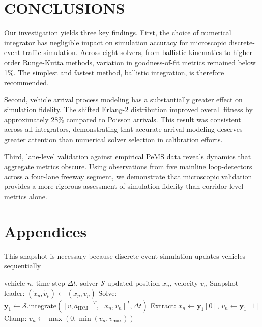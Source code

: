 \documentclass{scspaperproc}
\theoremstyle{scsthe}
\begin{document}
\section{CONCLUSIONS}
\enlargethispage{3\baselineskip}
\label{sec:conclusions}
Our investigation yields three key findings. First, the choice of numerical integrator
has negligible impact on simulation accuracy for microscopic discrete-event traffic simulation. Across eight solvers, from ballistic kinematics to higher-order Runge-Kutta methods, variation in goodness-of-fit metrics remained below 1\%. The simplest and fastest method, ballistic integration, is therefore recommended.

Second, vehicle arrival process modeling has a substantially greater effect on simulation fidelity. The shifted Erlang-2 distribution improved overall fitness by approximately 28\% compared to Poisson arrivals. This result was consistent across all integrators, demonstrating that accurate arrival modeling deserves greater attention than numerical solver selection in calibration efforts.

Third, lane-level validation against empirical PeMS data reveals dynamics that aggregate metrics obscure. Using observations from five mainline loop-detectors across a four-lane freeway segment, we demonstrate that microscopic validation provides a more rigorous assessment of simulation fidelity than corridor-level metrics alone.


\appendix
\section{Appendices} \label{app:quadratic}
This snapshot is necessary because discrete-event simulation updates vehicles sequentially
\begin{algorithm}
\caption{Per-Vehicle State Update}
\begin{algorithmic}[1]
\Require vehicle $n$, time step $\Delta t$, solver $\mathcal{S}$
\Ensure updated position $x_n$, velocity $v_n$
\State Snapshot leader: $(\tilde{x}_p, \tilde{v}_p) \gets (x_p, v_p)$
\State Solve: $\mathbf{y}_1 \gets \mathcal{S}.\text{integrate}([v, a_{\text{IDM}}]^T, [x_n, v_n]^T, \Delta t)$
\State Extract: $x_n \gets \mathbf{y}_1[0]$, $v_n \gets \mathbf{y}_1[1]$
\State Clamp: $v_n \gets \max(0, \min(v_n, v_{\max}))$
\end{algorithmic}
\end{algorithm}



\end{document}
